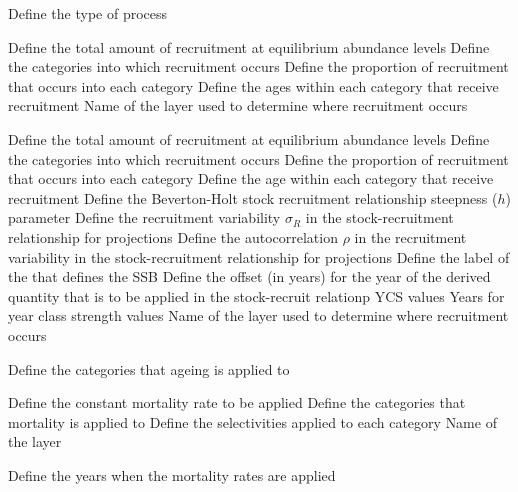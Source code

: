  {Define the type of process}
\par\textbf{}\par
{} {Define the total amount of recruitment at equilibrium abundance levels}
 {Define the categories into which recruitment occurs}
 {Define the proportion of recruitment that occurs into each category}
 {Define the ages within each category that receive recruitment}
 {Name of the layer used to determine where recruitment occurs}
\par\textbf{}\par
{} {Define the total amount of recruitment at equilibrium abundance levels}
 {Define the categories into which recruitment occurs}
 {Define the proportion of recruitment that occurs into each category}
 {Define the age within each category that receive recruitment}
 {Define the Beverton-Holt stock recruitment relationship steepness ($h$) parameter}
 {Define the recruitment variability $\sigma_R$ in the stock-recruitment relationship for projections}
 {Define the autocorrelation $\rho$ in the recruitment variability in the stock-recruitment relationship for projections}
 {Define the label of the  that defines the SSB}
 {Define the offset (in years) for the year of the derived quantity that is to be applied in the stock-recruit relationp}
 {YCS values}
 {Years for year class strength values}
 {Name of the layer used to determine where recruitment occurs}
\par\textbf{}\par
{} {Define the categories that ageing is applied to}
\par\textbf{}\par
{} {Define the constant mortality rate to be applied}
 {Define the categories that mortality is applied to}
 {Define the selectivities applied to each category}
 {Name of the layer}
\par\textbf{}\par
{} {Define the years when the mortality rates are applied}
